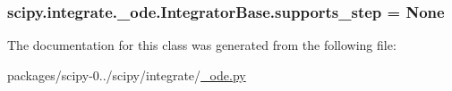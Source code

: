 \subsubsection[{supports\+\_\+step}]{\setlength{\rightskip}{0pt plus 5cm}scipy.\+integrate.\+\_\+ode.\+Integrator\+Base.\+supports\+\_\+step = None\hspace{0.3cm}{\ttfamily [static]}}\label{classscipy_1_1integrate_1_1__ode_1_1IntegratorBase_adabd590bff9407d7646a3f588901816e}


The documentation for this class was generated from the following file\+:\begin{DoxyCompactItemize}
\item 
packages/scipy-\/0../scipy/integrate/\hyperlink{__ode_8py}{\+\_\+ode.\+py}\end{DoxyCompactItemize}

